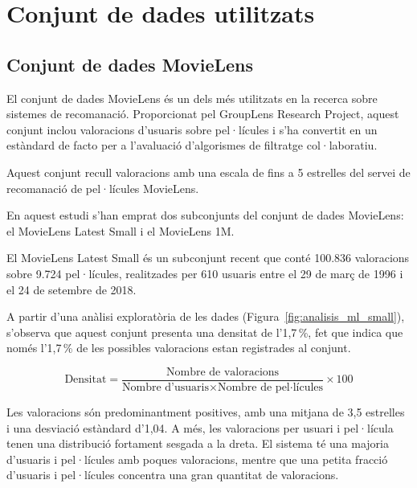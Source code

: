 \documentclass[a4paper,12pt]{report}
\begin{document}
\section{Conjunt de dades utilitzats}

\subsection{Conjunt de dades MovieLens} 

El conjunt de dades MovieLens \cite{harper2015movielens} és un dels més utilitzats en la recerca sobre sistemes de recomanació. Proporcionat pel GroupLens Research Project, aquest conjunt inclou valoracions d’usuaris sobre pel·lícules i s’ha convertit en un estàndard de facto per a l’avaluació d’algorismes de filtratge col·laboratiu.

Aquest conjunt recull valoracions amb una escala de fins a 5 estrelles del servei de recomanació de pel·lícules MovieLens.

En aquest estudi s’han emprat dos subconjunts del conjunt de dades MovieLens: el MovieLens Latest Small i el MovieLens 1M.

El MovieLens Latest Small és un subconjunt recent que conté 100.836 valoracions sobre 9.724 pel·lícules, realitzades per 610 usuaris entre el 29 de març de 1996 i el 24 de setembre de 2018.

A partir d’una anàlisi exploratòria de les dades (Figura~\ref{fig:analisis_ml_small}), s’observa que aquest conjunt presenta una densitat de l’1,7\,\%, fet que indica que només l’1,7\,\% de les possibles valoracions estan registrades al conjunt.

\[
\text{Densitat} = \frac{\text{Nombre de valoracions}}{\text{Nombre d’usuaris} \times \text{Nombre de pel·lícules}} \times 100
\]

Les valoracions són predominantment positives, amb una mitjana de 3,5 estrelles i una desviació estàndard d’1,04.
A més, les valoracions per usuari i pel·lícula tenen una distribució fortament sesgada a la dreta.
El sistema té una majoria d'usuaris i pel·lícules amb poques valoracions, mentre que una petita fracció d’usuaris i pel·lícules concentra una gran quantitat de valoracions.
\end{document}
